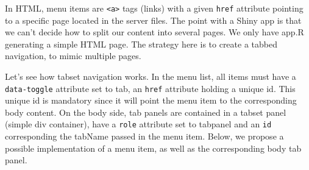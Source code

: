\documentclass[]{book}
\newenvironment{Shaded}{\begin{snugshade}}{\end{snugshade}}
\newcommand{\CommentTok}[1]{\textcolor[rgb]{0.56,0.35,0.01}{\textit{#1}}}
\newcommand{\ControlFlowTok}[1]{\textcolor[rgb]{0.13,0.29,0.53}{\textbf{#1}}}
\newcommand{\DataTypeTok}[1]{\textcolor[rgb]{0.13,0.29,0.53}{#1}}
\newcommand{\KeywordTok}[1]{\textcolor[rgb]{0.13,0.29,0.53}{\textbf{#1}}}
\newcommand{\NormalTok}[1]{#1}
\newcommand{\OperatorTok}[1]{\textcolor[rgb]{0.81,0.36,0.00}{\textbf{#1}}}
\newcommand{\OtherTok}[1]{\textcolor[rgb]{0.56,0.35,0.01}{#1}}
\newcommand{\StringTok}[1]{\textcolor[rgb]{0.31,0.60,0.02}{#1}}
\begin{document}
In HTML, menu items are \texttt{\textless{}a\textgreater{}} tags (links) with a given \texttt{href} attribute pointing to a specific page located in the server files. The point with a Shiny app is that we can't decide how to split our content into several pages. We only have app.R generating a simple HTML page. The strategy here is to create a tabbed navigation, to mimic multiple pages.

Let's see how tabset navigation works. In the menu list, all items must have a \texttt{data-toggle} attribute set to tab, an \texttt{href} attribute holding a unique id. This unique id is mandatory since it will point the menu item to the corresponding body content. On the body side, tab panels are contained in a tabset panel (simple div container), have a \texttt{role} attribute set to tabpanel and an \texttt{id} corresponding the tabName passed in the menu item. Below, we propose a possible implementation of a menu item, as well as the corresponding body tab panel.

\begin{Shaded}
\end{Shaded}
\end{document}
